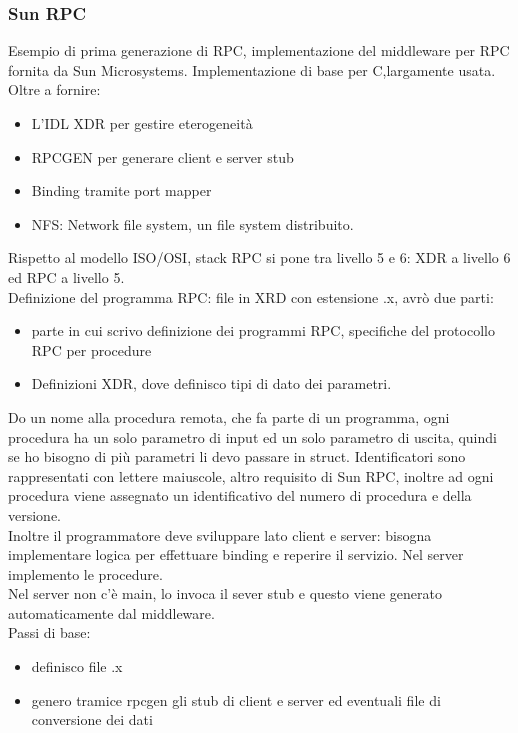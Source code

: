 \documentclass[16px]{article}
\begin{document}
\subsubsection{Sun RPC}
Esempio di prima generazione di RPC, implementazione del middleware per RPC fornita da Sun Microsystems. Implementazione di base per C,largamente usata. Oltre a fornire:
\begin{itemize}
\item L'IDL XDR per gestire eterogeneità
\item RPCGEN per generare client e server stub
\item Binding tramite port mapper
\item NFS: Network file system, un file system distribuito.
\end{itemize}
Rispetto al modello ISO/OSI, stack RPC si pone tra livello 5 e 6: XDR  a livello 6 ed RPC a livello 5.\\ Definizione del programma RPC:
file in XRD con estensione .x, avrò due parti:
\begin{itemize}
\item parte in cui scrivo definizione dei programmi RPC, specifiche del protocollo RPC per procedure
\item Definizioni XDR, dove definisco tipi di dato dei parametri.
\end{itemize}
Do un nome alla procedura remota, che fa parte di un programma, ogni procedura ha un solo parametro di input ed un solo parametro di uscita, quindi se ho bisogno di più parametri li devo passare in struct. Identificatori sono rappresentati con lettere maiuscole, altro requisito di Sun RPC, inoltre ad ogni procedura viene assegnato un identificativo del numero di procedura e della versione.\\ Inoltre il programmatore deve sviluppare lato client e server: bisogna implementare logica per effettuare binding e reperire il servizio. Nel server implemento le procedure.\\Nel server non c'è main, lo invoca il sever stub e questo viene generato automaticamente dal middleware.
\\Passi di base:
\begin{itemize}
\item definisco file .x
\item genero tramice rpcgen gli stub di client e server ed eventuali file di conversione dei dati
\end{itemize}
\end{document}
